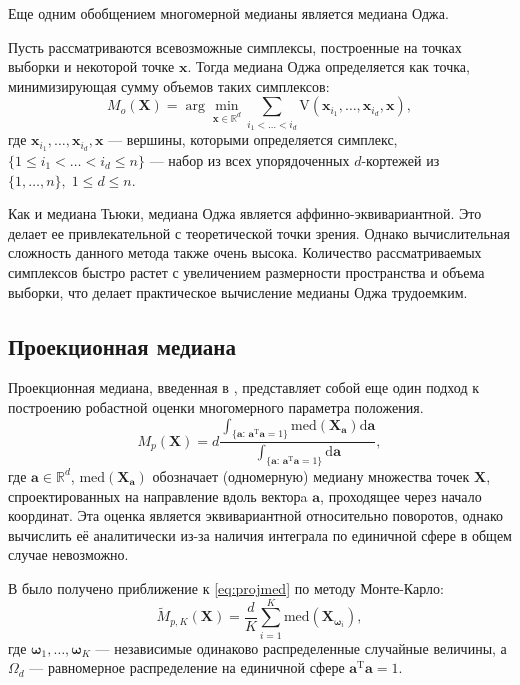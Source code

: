 Еще одним обобщением многомерной медианы является медиана Оджа.

Пусть рассматриваются всевозможные симплексы, построенные на точках выборки и некоторой точке $\mathbf{x}$. Тогда медиана Оджа определяется как точка, минимизирующая сумму объемов таких симплексов:
\begin{equation*}
M_o(\mathbf{X})=  \arg\min_{\mathbf{x}\in \mathbb{R}^d} \sum\limits_{i_1 <\ldots<i_d} \mathrm{V}(\mathbf{x}_{i_1},\ldots,\mathbf{x}_{i_d}, \mathbf{x}),
\end{equation*}
где $\mathbf{x}_{i_1},\ldots,\mathbf{x}_{i_d},\mathbf{x}$ --- вершины, которыми определяется симплекс, $\{1\leqslant i_1 <\ldots<i_d\leqslant n\}$ --- набор из всех упорядоченных $d$-кортежей из $\{1,\ldots,n\},\; 1\leqslant d \leqslant n$.

Как и медиана Тьюки, медиана Оджа является аффинно-эквивариантной. Это делает ее привлекательной с теоретической точки зрения. Однако вычислительная сложность данного метода также очень высока. Количество рассматриваемых симплексов быстро растет с увеличением размерности пространства и объема выборки, что делает практическое вычисление медианы Оджа трудоемким.


\subsection{Проекционная медиана}

Проекционная медиана, введенная в \cite{durocher_projection_2009}, представляет собой еще один подход к построению робастной оценки многомерного параметра положения. 
\begin{equation}\label{eq:projmed}
M_p(\mathbf{X}) = d\frac{\int_{\{\mathbf{a}: \, \mathbf{a}^{\mathrm{T}} \mathbf{a} = 1\}} \text{med}(\mathbf{X}_{\mathbf{a}}) \textrm{d}\mathbf{a}}{\int_{\{\mathbf{a}: \, \mathbf{a}^{\mathrm{T}} \mathbf{a} = 1\}} \textrm{d}\mathbf{a}},
\end{equation}
где $\mathbf{a} \in \mathbb{R}^{d}$, $\text{med}(\mathbf{X}_{\mathbf{a}})$ обозначает (одномерную) медиану множества точек $\mathbf{X}$, спроектированных на направление вдоль векторa $\mathbf{a}$, проходящее через начало координат. Эта оценка является эквивариантной относительно поворотов, однако вычислить её аналитически из-за наличия интеграла по единичной сфере в общем случае невозможно.

В \cite{durocher_projection_2017} было получено приближение к \eqref{eq:projmed} по методу Монте-Карло:
\begin{equation*}
\widetilde M_{p, K}(\mathbf{X}) = \frac{d}{K} \sum_{i=1}^{K} \text{med}(\mathbf{X}_{\boldsymbol{ \omega}_i}),
\end{equation*}
где $ \boldsymbol{\omega}_1, \ldots, \boldsymbol{\omega}_K$ --- независимые одинаково распределенные случайные величины, а $\Omega_d$ --- равномерное распределение на единичной сфере $\mathbf{a}^{\mathrm{T}} \mathbf{a} = 1$.

